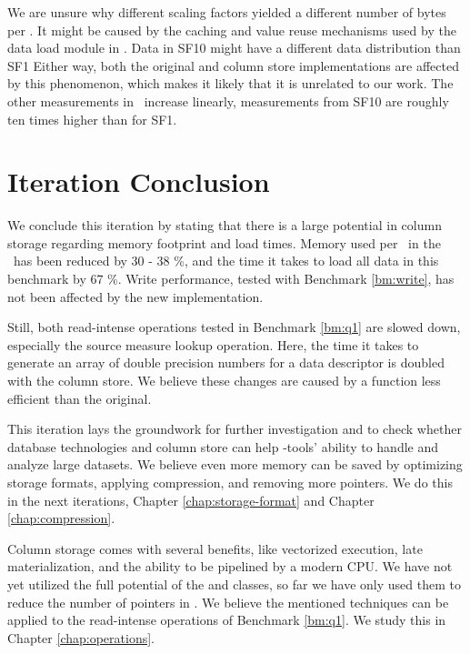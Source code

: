 We are unsure why different scaling factors yielded a different number of bytes per \lineitem. It might be caused by the caching and value reuse mechanisms used by the data load module in \gap. Data in SF10 might have a different data distribution than SF1 Either way, both the original and column store implementations are affected by this phenomenon, which makes it likely that it is unrelated to our work. The other measurements in \tpchdl~increase linearly, measurements from SF10 are roughly ten times higher than for SF1. 

\section{Iteration Conclusion}
\label{sec:Iteration Conclusion}
We conclude this iteration by stating that there is a large potential in column storage regarding memory footprint and load times. Memory used per \lineitem~in the \tpchdl~has been reduced by 30 - 38 \%, and the time it takes to load all data in this benchmark by 67 \%. Write performance, tested with Benchmark \ref{bm:write}, has not been affected by the new implementation.

Still, both read-intense operations tested in Benchmark \ref{bm:q1} are slowed down, especially the source measure lookup operation. Here, the time it takes to generate an array of double precision numbers for a data descriptor is doubled with the column store. We believe these changes are caused by a  function less efficient than the original.

This iteration lays the groundwork for further investigation and to check whether database technologies and column store can help \mdd-tools' ability to handle and analyze large datasets. We believe even more memory can be saved by optimizing storage formats, applying compression, and removing more pointers. We do this in the next iterations, Chapter \ref{chap:storage-format} and Chapter \ref{chap:compression}. 

Column storage comes with several benefits, like vectorized execution, late materialization, and the ability to be pipelined by a modern CPU. We have not yet utilized the full potential of the  and  classes, so far we have only used them to reduce the number of pointers in \gap. We believe the mentioned techniques can be applied to the read-intense operations of Benchmark \ref{bm:q1}. We study this in Chapter \ref{chap:operations}.

